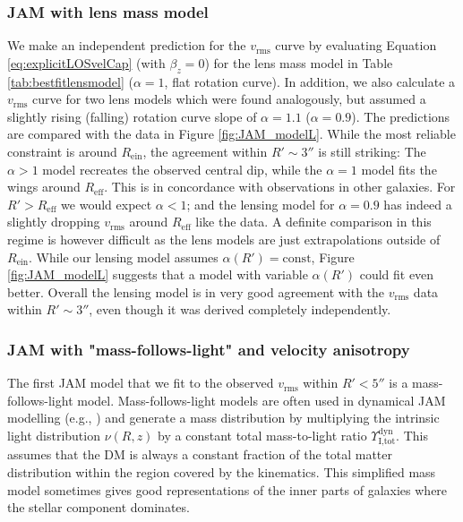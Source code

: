 \documentclass[useAMS,usenatbib]{mnras}
\begin{document}
\subsubsection{JAM with lens mass model}

We make an independent prediction for the $v_\text{rms}$ curve by evaluating Equation \eqref{eq:explicitLOSvelCap} (with $\beta_z = 0$) for the lens mass model in Table \ref{tab:bestfitlensmodel} ($\alpha = 1$, flat rotation curve). In addition, we also calculate a  $v_\text{rms}$ curve for two lens models which were found analogously, but assumed a slightly rising (falling) rotation curve slope of $\alpha=1.1$ ($\alpha=0.9$). The predictions are compared with the data in Figure \ref{fig:JAM_modelL}. While the most reliable constraint is around $R_\text{ein}$, the agreement within $R' \sim 3''$ is still striking: The $\alpha > 1$ model recreates the observed central dip, while the $\alpha = 1$ model fits the wings around $R_\text{eff}$. This is in concordance with observations in other galaxies. For $R'> R_\text{eff}$ we would expect $\alpha<1$; and the lensing model for $\alpha=0.9$ has indeed a slightly dropping $v_\text{rms}$ around $R_\text{eff}$ like the data. A definite comparison in this regime is however difficult as the lens models are just extrapolations outside of $R_\text{ein}$. While our lensing model assumes $\alpha(R')=\text{const}$, Figure \ref{fig:JAM_modelL} suggests that a model with variable $\alpha(R')$ could fit even better. Overall the lensing model is in very good agreement with the $v_\text{rms}$ data within $R' \sim 3''$, even though it was derived completely independently.

\subsubsection{JAM with "mass-follows-light" and velocity anisotropy} \label{sec:results_JAM_SB_MfL}

The first JAM model that we fit to the observed $v_\text{rms}$ within $R'<5''$ is a mass-follows-light model. Mass-follows-light models are often used in dynamical JAM modelling (e.g., \citealt{GlennEC,Cap06}) and generate a mass distribution by multiplying the intrinsic light distribution $\nu(R,z)$ by a constant total mass-to-light ratio  $\Upsilon_\text{I,tot}^\text{dyn}$. This assumes that the DM is always a constant fraction of the total matter distribution within the region covered by the kinematics. This simplified mass model sometimes gives good representations of the inner parts of galaxies where the stellar component dominates.
\end{document}
